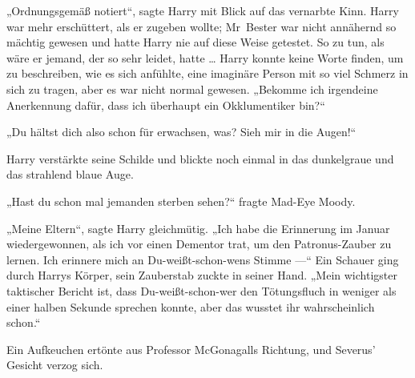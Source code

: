 „Ordnungsgemäß notiert“, sagte Harry mit Blick auf das vernarbte Kinn. Harry war mehr erschüttert, als er zugeben wollte; Mr~Bester war nicht annähernd so mächtig gewesen und hatte Harry nie auf diese Weise getestet. So zu tun, als wäre er jemand, der so sehr leidet, hatte … Harry konnte keine Worte finden, um zu beschreiben, wie es sich anfühlte, eine imaginäre Person mit so viel Schmerz in sich zu tragen, aber es war nicht normal gewesen.
„Bekomme ich irgendeine Anerkennung dafür, dass ich überhaupt ein Okklumentiker bin?“

„Du hältst dich also schon für erwachsen, was? Sieh mir in die Augen!“

Harry verstärkte seine Schilde und blickte noch einmal in das dunkelgraue und das strahlend blaue Auge.

„Hast du schon mal jemanden sterben sehen?“ fragte Mad-Eye Moody.

„Meine Eltern“, sagte Harry gleichmütig.
„Ich habe die Erinnerung im Januar wiedergewonnen, als ich vor einen Dementor trat, um den Patronus-Zauber zu lernen. Ich erinnere mich an Du-weißt-schon-wens Stimme —“ Ein Schauer ging durch Harrys Körper, sein Zauberstab zuckte in seiner Hand.
„Mein wichtigster taktischer Bericht ist, dass Du-weißt-schon-wer den Tötungsfluch in weniger als einer halben Sekunde sprechen konnte, aber das wusstet ihr wahrscheinlich schon.“

Ein Aufkeuchen ertönte aus Professor McGonagalls Richtung, und Severus’ Gesicht verzog sich.

